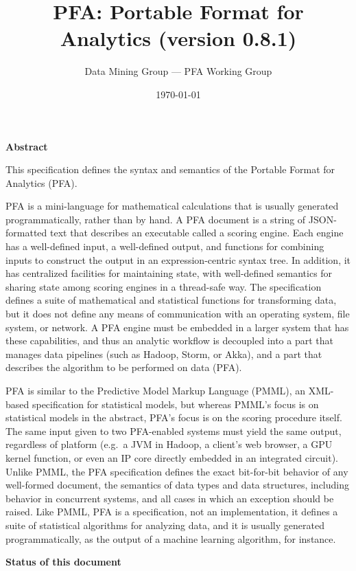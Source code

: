 \documentclass{article}
\title{PFA: Portable Format for Analytics (version 0.8.1)}
\author{Data Mining Group --- PFA Working Group}
\date{\today}
\theoremstyle{definition}
\begin{document}
\maketitle

{\large \bf Abstract}
\vspace{0.25 cm}

This specification defines the syntax and semantics of the Portable Format for Analytics (PFA).

PFA is a mini-language for mathematical calculations that is usually generated programmatically, rather than by hand.  A PFA document is a string of JSON-formatted text that describes an executable called a scoring engine.  Each engine has a well-defined input, a well-defined output, and functions for combining inputs to construct the output in an expression-centric syntax tree.  In addition, it has centralized facilities for maintaining state, with well-defined semantics for sharing state among scoring engines in a thread-safe way.  The specification defines a suite of mathematical and statistical functions for transforming data, but it does not define any means of communication with an operating system, file system, or network.  A PFA engine must be embedded in a larger system that has these capabilities, and thus an analytic workflow is decoupled into a part that manages data pipelines (such as Hadoop, Storm, or Akka), and a part that describes the algorithm to be performed on data (PFA).

PFA is similar to the Predictive Model Markup Language (PMML), an XML-based specification for statistical models, but whereas PMML's focus is on statistical models in the abstract, PFA's focus is on the scoring procedure itself.  The same input given to two PFA-enabled systems must yield the same output, regardless of platform (e.g.\ a JVM in Hadoop, a client's web browser, a GPU kernel function, or even an IP core directly embedded in an integrated circuit).  Unlike PMML, the PFA specification defines the exact bit-for-bit behavior of any well-formed document, the semantics of data types and data structures, including behavior in concurrent systems, and all cases in which an exception should be raised.  Like PMML, PFA is a specification, not an implementation, it defines a suite of statistical algorithms for analyzing data, and it is usually generated programmatically, as the output of a machine learning algorithm, for instance.

\vspace{0.5 cm}
{\large \bf Status of this document}
\vspace{0.25 cm}
\end{document}
